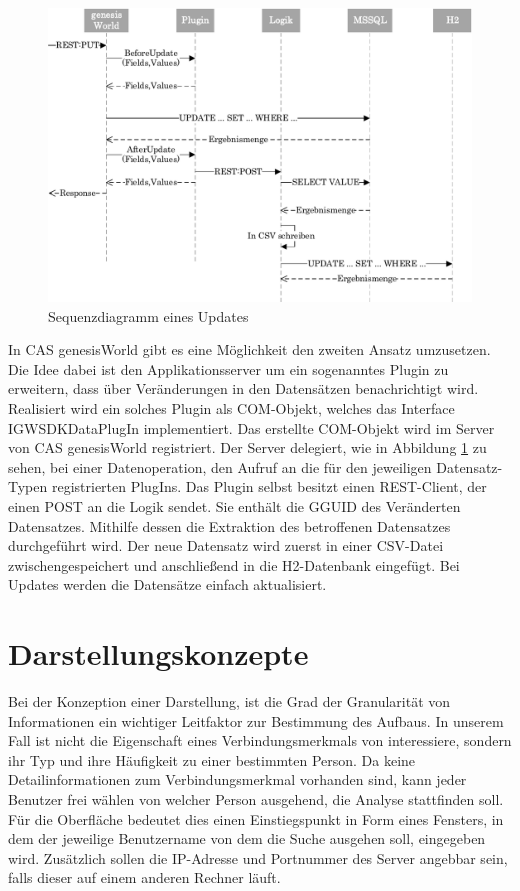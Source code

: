 \begin{figure}[htbp]
\centering
  \includegraphics[width=1.0\textwidth, width=1.0\textwidth]{pics/sequenzdiagramm.pdf}
\caption{Sequenzdiagramm eines Updates}
\label{konzept_sequenz}
\end{figure}

In CAS genesisWorld gibt es eine Möglichkeit den zweiten Ansatz umzusetzen. Die Idee dabei ist den Applikationsserver um ein sogenanntes Plugin zu erweitern, dass über Veränderungen in den Datensätzen benachrichtigt wird. Realisiert wird ein solches Plugin als COM-Objekt, welches das Interface IGWSDKDataPlugIn implementiert. Das erstellte COM-Objekt wird im Server von CAS genesisWorld registriert. Der Server delegiert, wie in Abbildung \ref{konzept_sequenz} zu sehen, bei einer Datenoperation, den Aufruf an die für den jeweiligen Datensatz-Typen registrierten PlugIns. Das Plugin selbst besitzt einen REST-Client, der einen POST an die Logik sendet. Sie enthält die GGUID des Veränderten Datensatzes. Mithilfe dessen die Extraktion des betroffenen Datensatzes durchgeführt wird. Der neue Datensatz wird zuerst in einer CSV-Datei zwischengespeichert und anschließend in die H2-Datenbank eingefügt. Bei Updates werden die Datensätze einfach aktualisiert. 

\section{Darstellungskonzepte}
\label{ch:Konzeption:sec:Darstellungskonzepte}

Bei der Konzeption einer Darstellung, ist die Grad der Granularität von Informationen ein wichtiger Leitfaktor zur Bestimmung des Aufbaus. In unserem Fall ist nicht die Eigenschaft eines Verbindungsmerkmals von interessiere, sondern ihr Typ und ihre Häufigkeit zu einer bestimmten Person. Da keine Detailinformationen zum Verbindungsmerkmal vorhanden sind, kann jeder Benutzer frei wählen von welcher Person ausgehend, die Analyse stattfinden soll. Für die Oberfläche bedeutet dies einen Einstiegspunkt in Form eines Fensters, in dem der jeweilige Benutzername von dem die Suche ausgehen soll, eingegeben wird. Zusätzlich sollen die IP-Adresse und Portnummer des Server angebbar sein, falls dieser auf einem anderen Rechner läuft.

